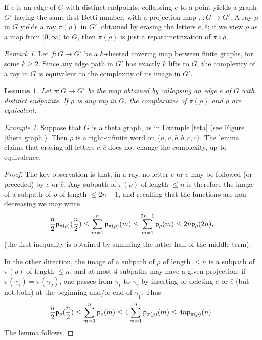 \documentclass[11pt]{amsart}
\newtheorem{lem}[thm]{Lemma}
\theoremstyle{remark}
\newtheorem{rem}[thm]{Remark}
\newtheorem{example}[thm]{Example}
\newcommand{\cp}{{\sf  p}}
\begin{document}
If $e$ is an edge of $G$ with distinct endpoints,   collapsing $e$ to a point yields a graph $G'$ having the same first Betti number, with a projection map 
$\pi:G\to G'$. A ray $\rho$ in $G$ yields a ray $\pi(\rho)$ in $G'$, obtained by erasing the letters $e,\bar e$; if we view $\rho$ as a map from $[0,\infty)$ to $G$, then $\pi(\rho)$ is just a reparametrization of $\pi\circ \rho$. 

\begin{rem} \label{k-sheet}
  Let  $f:G\to G'$ be a $k$-sheeted covering map between finite graphs, for some $k\ge2$. Since any edge path in $G'$ has exactly $k$ lifts to $G$,  the complexity of a ray in $G$ is equivalent to the complexity of its image in $G'$. 
\end{rem}

\begin{lem} \label{cola}
Let $\pi:G\to G'$ be the map obtained by collapsing  an edge $e$ of $G$ with distinct endpoints. If $\rho$ is any ray in $G$,   the complexities of $\pi(\rho)$ and $\rho$ are equivalent.
 \end{lem}
 
 
\begin{example}
 Suppose that $G$ is a theta graph, as in Example \ref{teta} (see Figure \ref{theta graph}). Then $\rho$ is a right-infinite word on $\{a,\bar a, b, \bar b, c,\bar c\}$. The lemma claims that erasing all letters $c,\bar c$ does not change the complexity, up to equivalence. 
 \end{example}

\begin{proof}
 The key observation is that, in a ray, no letter $e$ or $\bar e$ may be followed (or preceded) by $e$ or $\bar e$. Any subpath of $\pi(\rho)$ of length $\le n$ is therefore the image of a subpath of $\rho$ of length $\le 2n-1$, and   recalling that the functions are non-decreasing we may write
  $$\frac n2 \cp_{\pi(\rho)}(\frac n2)\le\sum_{m=1}^n \cp_{\pi(\rho)}(m)\le\sum_{m=1}^{2n-1} \cp_\rho(m)\le2n\cp_\rho(2n),
   $$
    (the first inequality is obtained by summing the latter half of the middle term).
   
   In the other direction, the image of a subpath of $\rho$ of length $\le  n$ is a subpath of $\pi(\rho)$ of length $\le  n$, and at most 4 subpaths may have a given projection: if $\pi(\gamma_1)=\pi(\gamma_2)$, one passes from $\gamma_1$ to $\gamma_2$ by inserting or deleting $e$ or $\bar e$ (but not both) at the beginning and/or end of $\gamma_1$. Thus 
    $$\frac n2 \cp_\rho(\frac n2)\le\sum_{m=1}^n \cp_\rho(m)\le4\sum_{m=1}^{ n} \cp_{\pi(\rho)}(m)\le4n\cp_{\pi(\rho)}(n).
   $$
The lemma follows. 
\end{proof}
\end{document}
